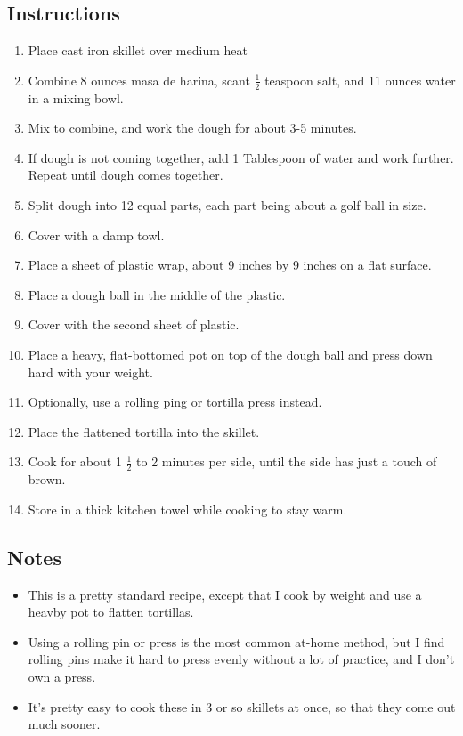 \begin{multicols}{2}
\subsection*{Instructions}
\begin{enumerate}
    \item Place cast iron skillet over medium heat
    \item Combine 8 ounces masa de harina, scant \( \frac{1}{2} \) teaspoon salt, and 11 ounces water in a mixing bowl.
    \item Mix to combine, and work the dough for about 3-5 minutes.
    \item If dough is not coming together, add 1 Tablespoon of water and work further. Repeat until dough comes together.
    \item Split dough into 12 equal parts, each part being about a golf ball in size.
    \item Cover with a damp towl.
    \item Place a sheet of plastic wrap, about 9 inches by 9 inches on a flat surface.
    \item Place a dough ball in the middle of the plastic.
    \item Cover with the second sheet of plastic.
    \item Place a heavy, flat-bottomed pot on top of the dough ball and press down hard with your weight.
    \item Optionally, use a rolling ping or tortilla press instead.
    \item Place the flattened tortilla into the skillet.
    \item Cook for about 1 \( \frac{1}{2} \) to 2 minutes per side, until the side has just a touch of brown.
    \item Store in a thick kitchen towel while cooking to stay warm.
\end{enumerate}

\subsection*{Notes}
\begin{itemize}
    \item This is a pretty standard recipe, except that I cook by weight and use a heavby pot to flatten tortillas.
    \item Using a rolling pin or press is the most common at-home method, but I find rolling pins make it hard to press evenly without a lot of practice, and I don't own a press.
    \item It's pretty easy to cook these in 3 or so skillets at once, so that they come out much sooner.
\end{itemize}
\end{multicols}
\clearpage